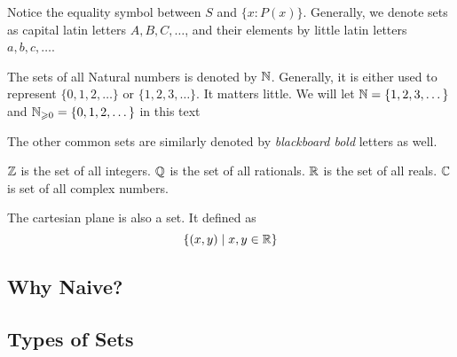 \begin{remark}
    Notice the equality symbol between \(S\) and \( \{x : P(x)\} \). Generally, we denote sets
    as capital latin letters \(A, B, C, \dots\), and their elements by little latin
    letters \(a, b, c, \dots\).
\end{remark}

\begin{example}
    The sets of all Natural numbers is denoted by \(\mathbb N\). Generally, it is either used to 
    represent \( \{0, 1, 2, \dots\} \) or \( \{1, 2, 3, \dots\} \). It matters little.
    We will let \(\mathbb N = \{1, 2, 3, \dots\}\) and \(\mathbb N_{\geqslant 0} = \{0, 1, 2, \dots\}\) in this text 
\end{example}

\begin{example}
    The other common sets are similarly denoted by \emph{blackboard bold} letters as well.
    \begin{enumerate}
        \ii \(\mathbb Z\) is the set of all integers.
        \ii \(\mathbb Q\) is the set of all rationals.
        \ii \(\mathbb R\) is the set of all reals.
        \ii \(\mathbb C\) is set of all complex numbers.
    \end{enumerate}
\end{example}


\begin{example}
    The cartesian plane is also a set. It defined as \[\{(x,y) \mid x, y \in \mathbb R\}\]
\end{example}

\subsection{Why Naive?}

\irrev


\subsection{Types of Sets}

